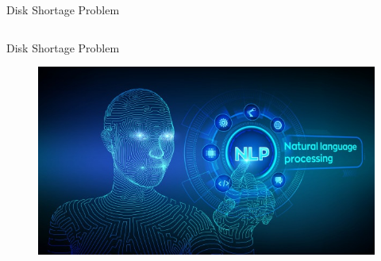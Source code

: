 \begin{frame}{Disk Shortage Problem}
\begin{columns}
     \end{columns}
\end{frame}
\begin{frame}{Disk Shortage Problem}
    \begin{figure}
        \centering
        \includegraphics[width = .7\textwidth, keepaspectratio]{attachments/vodro/nlp.jpg}
        \label{fig:nlp}
    \end{figure}
\end{frame}
